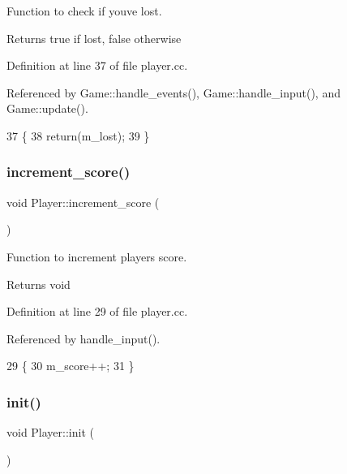 Function to check if you\textquotesingle{}ve lost. 

\begin{DoxyReturn}{Returns}
true if lost, false otherwise 
\end{DoxyReturn}


Definition at line 37 of file player.\+cc.



Referenced by Game\+::handle\+\_\+events(), Game\+::handle\+\_\+input(), and Game\+::update().


\begin{DoxyCode}
37                       \{
38     \textcolor{keywordflow}{return}(m\_lost);
39 \}
\end{DoxyCode}
\mbox{\label{class_player_ab58df1547917c39756f063b0d57a1793}} 
\subsubsection{\texorpdfstring{increment\+\_\+score()}{increment\_score()}}
{\footnotesize\ttfamily void Player\+::increment\+\_\+score (\begin{DoxyParamCaption}{ }\end{DoxyParamCaption})}



Function to increment player\textquotesingle{}s score. 

\begin{DoxyReturn}{Returns}
void 
\end{DoxyReturn}


Definition at line 29 of file player.\+cc.



Referenced by handle\+\_\+input().


\begin{DoxyCode}
29                              \{
30     m\_score++;
31 \}
\end{DoxyCode}
\mbox{\label{class_player_a015ea21fa1e7273e47d48cb20d9b12e3}} 
\subsubsection{\texorpdfstring{init()}{init()}}
{\footnotesize\ttfamily void Player\+::init (\begin{DoxyParamCaption}{ }\end{DoxyParamCaption})}



